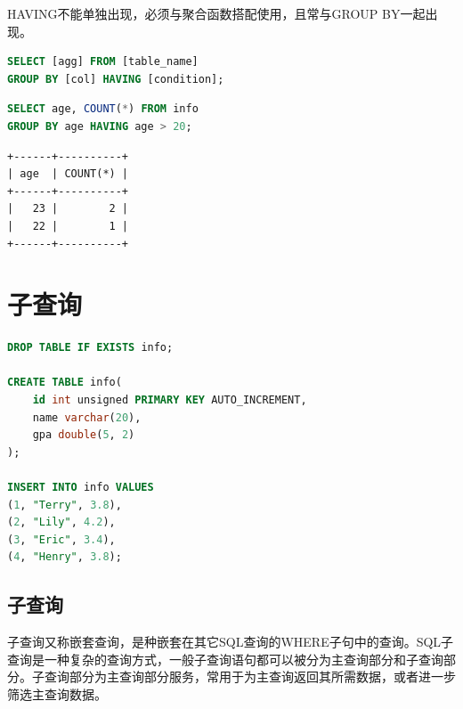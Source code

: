 \documentclass[12pt, openany, oneside]{book}
\begin{document}
HAVING不能单独出现，必须与聚合函数搭配使用，且常与GROUP BY一起出现。

\vspace{-0.5cm}

\begin{lstlisting}[language=SQL]
SELECT [agg] FROM [table_name]
GROUP BY [col] HAVING [condition];
\end{lstlisting}

\vspace{0.5cm}


\begin{lstlisting}[language=SQL]
SELECT age, COUNT(*) FROM info
GROUP BY age HAVING age > 20;
\end{lstlisting}

\begin{tcolorbox}
	\begin{verbatim}
+------+----------+
| age  | COUNT(*) |
+------+----------+
|   23 |        2 |
|   22 |        1 |
+------+----------+
	\end{verbatim}
\end{tcolorbox}

\newpage

\chapter{子查询}

\vspace{0.5cm}


\begin{lstlisting}[language=SQL]
DROP TABLE IF EXISTS info;

CREATE TABLE info(
    id int unsigned PRIMARY KEY AUTO_INCREMENT,
    name varchar(20),
    gpa double(5, 2)
);

INSERT INTO info VALUES
(1, "Terry", 3.8),
(2, "Lily", 4.2),
(3, "Eric", 3.4),
(4, "Henry", 3.8);
\end{lstlisting}

\vspace{0.5cm}

\section{子查询}

子查询又称嵌套查询，是种嵌套在其它SQL查询的WHERE子句中的查询。SQL子查询是一种复杂的查询方式，一般子查询语句都可以被分为主查询部分和子查询部分。子查询部分为主查询部分服务，常用于为主查询返回其所需数据，或者进一步筛选主查询数据。\\
\end{document}

